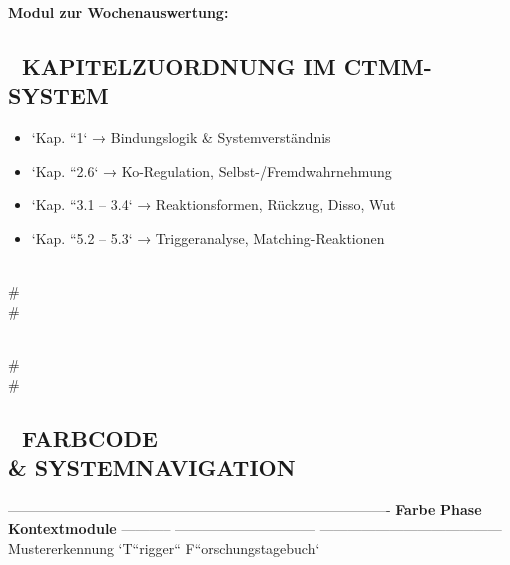 \textcolor{ctmmBlue}{\faPuzzlePiece} \textbf{Modul zur Wochenauswertung:}

\begin{itemize}
\item   \textbf{Trigger erkennen\textbf{
\end{itemize}

\begin{itemize}
\item   \textbf{Reaktionen vergleichen\textbf{
\end{itemize}

\begin{itemize}
\item   \textbf{Muster entschlüsseln -- aus beiden Perspektiven\textbf{
\end{itemize}

\subsection{📘 \textbf{KAPITELZUORDNUNG IM \textcolor{ctmmBlue}{CTMM}-SYSTEM}}

\begin{itemize}
\item   `Kap. ``1` → Bindungslogik \& Systemverständnis
\item   `Kap. ``2.6` → Ko-Regulation, Selbst-/Fremdwahrnehmung
\item   `Kap. ``3.1 -- 3.4` → Reaktionsformen, Rückzug, Disso, Wut
\item   `Kap. ``5.2 -- 5.3` → Triggeranalyse, Matching-Reaktionen
\end{itemize}

\\#\\#

\\#\\#

\subsection{\textbf{🎨 FARBCODE \\& SYSTEMNAVIGATION}}

----------------------------------------------------------------------------------
\textbf{Farbe}   \textbf{Phase}                      \textbf{Kontextmodule}
----------- ------------------------------ ---------------------------------------
🔵          Mustererkennung                `T``rigger`` F``orschungstagebuch`

